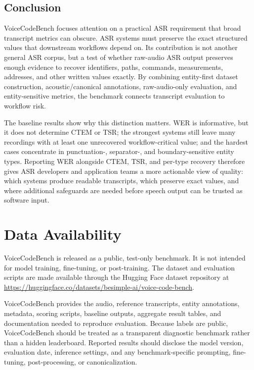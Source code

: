 \documentclass[10pt,twocolumn]{article}
\begin{document}
\subsection{Conclusion}\label{conclusion}

VoiceCodeBench focuses attention on a practical ASR requirement that
broad transcript metrics can obscure. ASR systems must preserve the exact
structured values that downstream workflows depend on. Its contribution is not
another general ASR corpus, but a test of whether raw-audio ASR output
preserves enough evidence to recover identifiers, paths, commands,
measurements, addresses, and other written values exactly. By combining
entity-first dataset construction, acoustic/canonical annotations,
raw-audio-only evaluation, and entity-sensitive metrics, the benchmark
connects transcript evaluation to workflow risk.

The baseline results show why this distinction matters. WER is
informative, but it does not determine CTEM or TSR; the strongest
systems still leave many recordings with at least one unrecovered
workflow-critical value; and the hardest cases concentrate in
punctuation-, separator-, and boundary-sensitive entity types. Reporting
WER alongside CTEM, TSR, and per-type recovery therefore gives ASR
developers and application teams a more actionable view of quality:
which systems produce readable transcripts, which preserve exact values,
and where additional safeguards are needed before speech output can be
trusted as software input.

\section{Data Availability}\label{data-availability}

VoiceCodeBench is released as a public, test-only benchmark. It is not
intended for model training, fine-tuning, or post-training. The dataset
and evaluation scripts are made available through the Hugging Face
dataset repository at
\url{https://huggingface.co/datasets/besimple-ai/voice-code-bench}.

VoiceCodeBench provides the audio, reference transcripts, entity
annotations, metadata, scoring scripts, baseline outputs, aggregate
result tables, and documentation needed to reproduce evaluation.
Because labels are public, VoiceCodeBench should be treated as a
transparent diagnostic benchmark rather than a hidden leaderboard.
Reported results should disclose the model version, evaluation date,
inference settings, and any benchmark-specific prompting, fine-tuning,
post-processing, or canonicalization.
\end{document}
